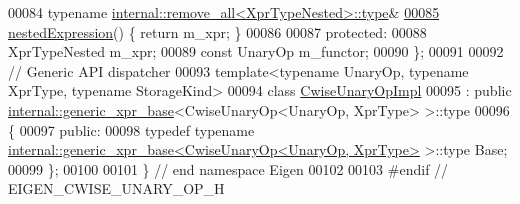 \begin{DoxyCode}
00084     \textcolor{keyword}{typename} \hyperlink{group___sparse_core___module}{internal::remove\_all<XprTypeNested>::type}&
\hyperlink{group___core___module_a2efe6055ea94b65c29dcf1cdcbd7e17e}{00085}     \hyperlink{group___core___module_a2efe6055ea94b65c29dcf1cdcbd7e17e}{nestedExpression}() \{ \textcolor{keywordflow}{return} m\_xpr; \}
00086 
00087   \textcolor{keyword}{protected}:
00088     XprTypeNested m\_xpr;
00089     \textcolor{keyword}{const} UnaryOp m\_functor;
00090 \};
00091 
00092 \textcolor{comment}{// Generic API dispatcher}
00093 \textcolor{keyword}{template}<\textcolor{keyword}{typename} UnaryOp, \textcolor{keyword}{typename} XprType, \textcolor{keyword}{typename} StorageKind>
00094 \textcolor{keyword}{class }\hyperlink{class_eigen_1_1_cwise_unary_op_impl}{CwiseUnaryOpImpl}
00095   : \textcolor{keyword}{public} \hyperlink{struct_eigen_1_1internal_1_1generic__xpr__base}{internal::generic\_xpr\_base}<CwiseUnaryOp<UnaryOp, XprType> >::type
00096 \{
00097 \textcolor{keyword}{public}:
00098   \textcolor{keyword}{typedef} \textcolor{keyword}{typename} \hyperlink{struct_eigen_1_1internal_1_1generic__xpr__base}{internal::generic\_xpr\_base<CwiseUnaryOp<UnaryOp, XprType>}
       >::type Base;
00099 \};
00100 
00101 \} \textcolor{comment}{// end namespace Eigen}
00102 
00103 \textcolor{preprocessor}{#endif // EIGEN\_CWISE\_UNARY\_OP\_H}
\end{DoxyCode}
